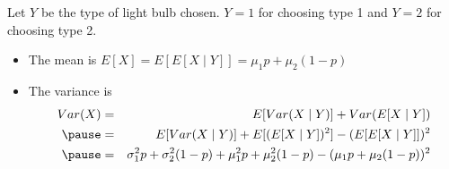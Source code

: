 \documentclass[slidestop,compress,mathserif]{beamer}
\begin{document}
\begin{frame}
\pause
Let $Y$ be the type of light bulb chosen. $Y = 1$ for choosing type 1 and $Y = 2$ for choosing type 2.
\pause
\begin{itemize}
\item The mean is $E[X] = E[E[X \mid Y]] = \mu_1 p + \mu_2 (1 - p)$
\pause
\item The variance is
{\small{
\begin{eqnarray*}
Var(X) &=& E[Var(X \mid Y)] + Var(E[X \mid Y])\\
\pause
&=&
 E[Var(X \mid Y)] + E[(E[X \mid Y])^2] - (E[E[X \mid Y]])^2\\
\pause
&=&
\sigma_1^2 p + \sigma_2^2 (1 - p) + \mu_1^2 p + \mu_2^2 (1 - p) - (\mu_1 p + \mu_2(1 - p))^2
\end{eqnarray*}
}}
\end{itemize}
\end{frame}
\end{document}
